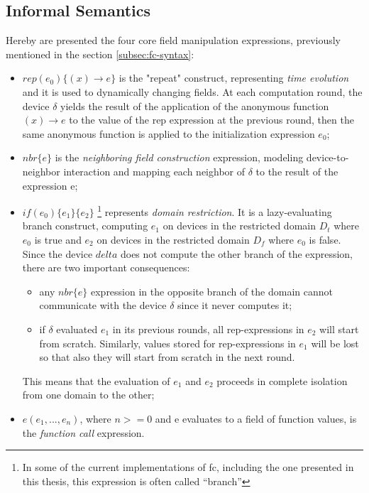 \subsection{Informal Semantics}
\label{subsec:fc-semantics}
Hereby are presented the four core field manipulation expressions, previously mentioned in the section \ref{subsec:fc-syntax}:

\begin{itemize}
    \item $rep(e_0)\{(x) \rightarrow e\}$ is the "repeat" construct, representing \textit{time evolution} and it is used to dynamically changing fields. At each computation round,
          the device $\delta$ yields the result of the application of the anonymous function $(x) \rightarrow e$ to the value of the rep expression at the previous round, then the same anonymous function is
          applied to the initialization expression $e_0$;
    \item $nbr\{e\}$ is the \textit{neighboring field construction} expression, modeling device-to-neighbor interaction and mapping each neighbor of $\delta$ to the result of the expression e;
    \item $if(e_0)\{e_1\}\{e_2\}$ \footnote[01]{In some of the current implementations of \ac{fc}, including the one presented in this thesis, this expression is often called ``branch''}
          represents \textit{domain restriction}. It is a lazy-evaluating branch construct, computing $e_1$ on devices in the restricted domain $D_t$ where $e_0$ is true and $e_2$ on devices in the restricted domain $D_f$ where $e_0$ is false.
          Since the device $delta$ does not compute the other branch of the expression, there are two important consequences:
          \begin{itemize}
              \item any $nbr\{e\}$ expression in the opposite branch of the domain cannot communicate with the device $\delta$ since it never computes it;
              \item if $\delta$ evaluated $e_1$ in its previous rounds, all rep-expressions in $e_2$ will start from scratch.
                    Similarly, values stored for rep-expressions in $e_1$ will be lost so that also they will start from scratch in the next round.
          \end{itemize}
          This means that the evaluation of $e_1$ and $e_2$ proceeds in complete isolation from one domain to the other;
    \item $e(e_1, ..., e_n)$, where $n>=0$ and e evaluates to a field of function values, is the \textit{function call} expression.
\end{itemize}




